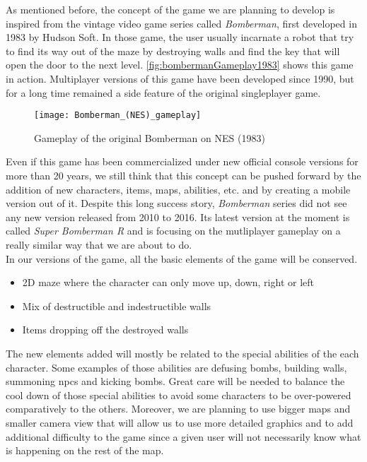 
As mentioned before, the concept of the game we are planning to develop is inspired from the vintage video game series called \textit{Bomberman}, first developed in 1983 by Hudson Soft. In those game, the user usually incarnate a robot that try to find its way out of the maze by destroying walls and find the key that will open the door to the next level. \autoref{fig:bombermanGameplay1983} shows this game in action. Multiplayer versions of this game have been developed since 1990, but for a long time remained a side feature of the original singleplayer game. \cite{wiki:bomberman} \\

\begin{figure}[ht]
  \begin{center}
    \texttt{[image: Bomberman\_(NES)\_gameplay]}
    \caption{Gameplay of the original Bomberman on NES (1983)}
    \label{fig:bombermanGameplay1983}
  \end{center}
  \vspace{-\baselineskip}
\end{figure}

Even if this game has been commercialized under new official console versions for more than 20 years, we still think that this concept can be pushed forward by the addition of new characters, items, maps, abilities, etc. and by creating a mobile version out of it. Despite this long success story, \textit{Bomberman} series did not see any new version released from 2010 to 2016. Its latest version at the moment is called \textit{Super Bomberman R} and is focusing on the mutliplayer gameplay on a really similar way that we are about to do. \\

In our versions of the game, all the basic elements of the game will be conserved.
\begin{itemize}
  \item 2D maze where the character can only move up, down, right or left
  \item Mix of destructible and indestructible walls
  \item Items dropping off the destroyed walls
\end{itemize}
The new elements added will mostly be related to the special abilities of the each character. Some examples of those abilities are defusing bombs, building walls, summoning \glspl{npc} and kicking bombs. Great care will be needed to balance the cool down of those special abilities to avoid some characters to be over-powered comparatively to the others. Moreover, we are planning to use bigger maps and smaller camera view that will allow us to use more detailed graphics and to add additional difficulty to the game since a given user will not necessarily know what is happening on the rest of the map. \\

